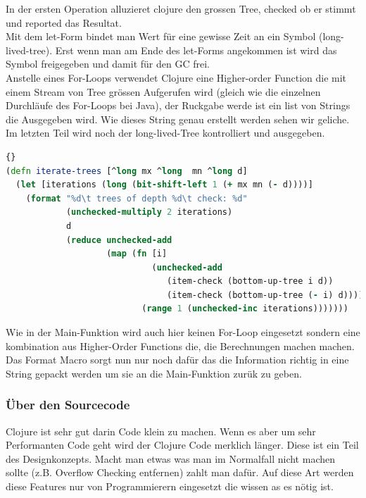\documentclass{fancydocument}
\begin{document}
In der ersten Operation alluzieret clojure den grossen Tree, checked
ob er stimmt und reported das Resultat.
\\
Mit dem let-Form bindet man Wert f\"ur eine gewisse Zeit an ein Symbol
(long-lived-tree). Erst wenn man am Ende des let-Forms angekommen ist
wird das Symbol freigegeben und damit f\"ur den GC frei.
\\
Anstelle eines For-Loops verwendet Clojure eine Higher-order Function
die mit einem Stream von Tree gr\"ossen Aufgerufen wird (gleich wie
die einzelnen Durchl\"aufe des For-Loops bei Java), der Ruckgabe werde
ist ein list von Strings die Ausgegeben wird. Wie dieses String genau
erstellt werden sehen wir geliche.
\\
Im letzten Teil wird noch der long-lived-Tree kontrolliert und
ausgegeben. 

\begin{lstlisting}[language=Clojure,caption=Clojure Worker-Funktion]{}
(defn iterate-trees [^long mx ^long  mn ^long d]
  (let [iterations (long (bit-shift-left 1 (+ mx mn (- d))))]
    (format "%d\t trees of depth %d\t check: %d"
            (unchecked-multiply 2 iterations)
            d
            (reduce unchecked-add
                    (map (fn [i]
                             (unchecked-add
                                (item-check (bottom-up-tree i d))
                                (item-check (bottom-up-tree (- i) d))))
                           (range 1 (unchecked-inc iterations)))))))
\end{lstlisting}

Wie in der Main-Funktion wird auch hier keinen For-Loop eingesetzt
sondern eine kombination aus Higher-Order Functions die, die
Berechnungen machen machen. Das Format Macro sorgt nun nur noch
daf\"ur das die Information richtig in eine String gepackt werden um
sie an die Main-Funktion zur\"uk zu geben.


\subsubsection{\"Uber den Sourcecode}

Clojure ist sehr gut darin Code klein zu machen. Wenn es aber um sehr
Performanten Code geht wird der Clojure Code merklich l\"anger. Diese
ist ein Teil des Designkonzepts. Macht man etwas was man im Normalfall
nicht machen sollte (z.B. Overflow Checking entfernen) zahlt man
daf\"ur. Auf diese Art werden diese Features nur von Programmierern
eingesetzt die wissen as es n\"otig ist.
\end{document}
